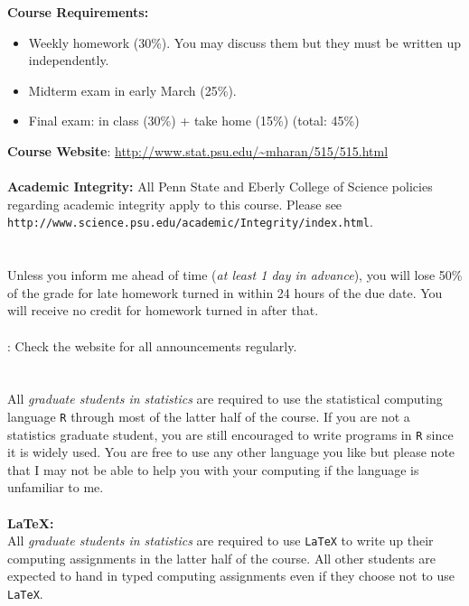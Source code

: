 \documentclass[11pt]{article}
\begin{document}
{\bf Course Requirements:}
\begin{itemize}
\item Weekly homework (30\%). You may discuss them but they must be written up independently.
\item Midterm exam in early March (25\%).
\item Final exam: in class (30\%) + take home (15\%) (total: 45\%)
\end{itemize} 
{\bf Course Website}: \url{http://www.stat.psu.edu/~mharan/515/515.html}\\\\
{\bf Academic Integrity:} All Penn State and Eberly
College of Science policies regarding
academic integrity apply to this course.  Please see\\
{\tt http://www.science.psu.edu/academic/Integrity/index.html}.
\\\\
\\
Unless you inform me ahead of time ({\it at least 1 day in advance}),
you will lose 50\% of the grade for late homework turned in within 24
hours of the due date. You will receive no credit for homework turned
in after that.\\\\
: Check the website for all announcements regularly.\\\\
\\
All {\it graduate students in statistics} are required to use the statistical
computing language {\tt R} through most of the latter half of the
course. If you are not a statistics graduate student, you are still
encouraged to write programs in {\tt R} since it is widely used. You
are free to use any other language you like but please note that I may
not be able to help you with your computing if the language is
unfamiliar to me.
\\\\
{\bf LaTeX:}\\
All {\it graduate students in statistics} are required to use {\tt LaTeX} to
write up their computing assignments in the latter half of the course.
All other students are expected to hand in typed computing assignments
even if they choose not to use {\tt LaTeX}.
\end{document}
